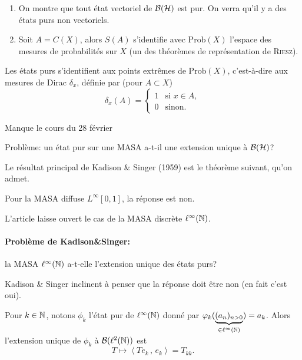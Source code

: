 \begin{exs}
  \begin{enumerate}
  \item On montre que tout état vectoriel de $\mathcal{B}(\mathcal{H})$ est pur. On verra qu'il y a des états purs non vectoriels.
  \item Soit $A = C(X)$, alors $S(A)$ s'identifie avec $\mathrm{Prob}(X)$ l'espace des mesures de probabilités
    sur $X$ (un des théorèmes de représentation de \textsc{Riesz}). \qedhere
  \end{enumerate}
\end{exs}

Les états purs s'identifient aux points extrêmes de $\mathrm{Prob}(X)$, c'est-à-dire aux mesures de Dirac
$\delta_x$, définie par (pour $A \subset X$)
\[ \delta_x(A) =
  \begin{cases}
    1 & \text{si } x \in A,\\
    0 & \text{sinon.}
  \end{cases}
\]


{\LARGE Manque le cours du 28 février}

Problème: un état pur sur une MASA a-t-il une extension unique à $\mathcal{B}(\mathcal{H})$?

Le résultat principal de Kadison \& Singer (1959) est le théorème suivant, qu'on admet.

\begin{theo}
  Pour la MASA diffuse $L^{\infty}[0,1]$, la réponse est non.
\end{theo}

L'article laisse ouvert le cas de la MASA discrète $\ell^\infty(\mathbb{N})$.

\paragraph{Problème de Kadison\&Singer:} la MASA $\ell^\infty(\mathbb{N})$ a-t-elle l'extension unique des états purs?

Kadison \& Singer inclinent à penser que la réponse doit être non (en fait c'est oui).

\begin{prop}
  Pour $k \in \mathbb{N}$, notons $\phi_k$ l'état pur de $\ell^\infty(\mathbb{N})$ donné par $\varphi_k(\underbrace{(a_n)_{n >
      0}}_{\in \ell^\infty(\mathbb{N})}) = a_k$. Alors l'extension unique de $\phi_k$ à $\mathcal{B}(\ell^2(\mathbb{N}))$ est 
  \[ T \mapsto \left \langle T e_k\, ,\, e_k \right \rangle = T_{kk}. \]
\end{prop}

